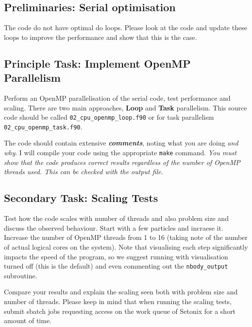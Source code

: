 \documentclass[11pt]{amsart}
\begin{document}
\subsection{{\color{Red} Preliminaries}: Serial optimisation\nopunct\\}\label{sec:tasks:serialopt}
The code do not have optimal do loops. Please look at the code and update these loops to improve the performance and show that this is the case. 

\subsection{{\color{Red} Principle Task}: Implement OpenMP Parallelism\nopunct\\}\label{sec:tasks:omp}
Perform an OpenMP parallelisation of the serial code, test performance and scaling. There are two main approaches, {\color{Orange}\textbf{Loop}} and {\color{Orange}\textbf{Task}} parallelism. This source code should be called \texttt{02\_cpu\_openmp\_loop.f90} or for task parallelism  \texttt{02\_cpu\_openmp\_task.f90}.

The code should contain extensive \textbf{\textit{comments}}, noting what you are doing \textit{and why}. I will compile your code using the appropriate \texttt{make} command.
{\centering \textit{You must show that the code produces correct results regardless of the number of OpenMP threads used. This can be checked with the output file.}}

\subsection{{\color{Red}Secondary Task}: Scaling Tests\nopunct\\}\label{sec:tasks:scaling}
Test how the code scales with number of threads and also problem size and discuss the observed behaviour. Start with a few particles and incraese it. Increase the number of OpenMP threads from 1 to 16 (taking note of the number of actual logical cores on the system). Note that visualising each step significantly impacts the speed of the program, so we suggest running with visualisation turned off (this is the default) and even commenting out the \texttt{nbody\_output} subroutine.

\par 
Compare your results and explain the scaling seen both with problem size and number of threads. Please keep in mind that when running the scaling tests, submit sbatch jobs requesting access on the work queue of Setonix for a short amount of time.
\end{document}
